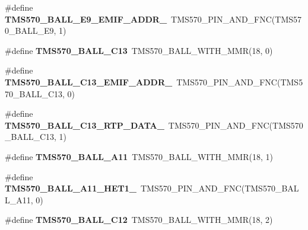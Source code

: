 \begin{DoxyCompactItemize}
\mbox{\label{tms570ls3137zwt-pins_8h_ada300d3784f0a8c7d62360eb2530f4e2}} 
\#define {\bfseries T\+M\+S570\+\_\+\+B\+A\+L\+L\+\_\+\+E9\+\_\+\+E\+M\+I\+F\+\_\+\+A\+D\+D\+R\+\_}~T\+M\+S570\+\_\+\+P\+I\+N\+\_\+\+A\+N\+D\+\_\+\+F\+NC(T\+M\+S570\+\_\+\+B\+A\+L\+L\+\_\+\+E9, 1)
\item 
\mbox{\label{tms570ls3137zwt-pins_8h_a3f60b3ca069714dc7c5f8578854b7519}} 
\#define {\bfseries T\+M\+S570\+\_\+\+B\+A\+L\+L\+\_\+\+C13}~T\+M\+S570\+\_\+\+B\+A\+L\+L\+\_\+\+W\+I\+T\+H\+\_\+\+M\+MR(18, 0)
\item 
\mbox{\label{tms570ls3137zwt-pins_8h_ad6ff7babd233f7440f5c92e0936c03ad}} 
\#define {\bfseries T\+M\+S570\+\_\+\+B\+A\+L\+L\+\_\+\+C13\+\_\+\+E\+M\+I\+F\+\_\+\+A\+D\+D\+R\+\_}~T\+M\+S570\+\_\+\+P\+I\+N\+\_\+\+A\+N\+D\+\_\+\+F\+NC(T\+M\+S570\+\_\+\+B\+A\+L\+L\+\_\+\+C13, 0)
\item 
\mbox{\label{tms570ls3137zwt-pins_8h_a67861843cebc379d3e9bfcf88ddfd8d8}} 
\#define {\bfseries T\+M\+S570\+\_\+\+B\+A\+L\+L\+\_\+\+C13\+\_\+\+R\+T\+P\+\_\+\+D\+A\+T\+A\+\_}~T\+M\+S570\+\_\+\+P\+I\+N\+\_\+\+A\+N\+D\+\_\+\+F\+NC(T\+M\+S570\+\_\+\+B\+A\+L\+L\+\_\+\+C13, 1)
\item 
\mbox{\label{tms570ls3137zwt-pins_8h_a5327195f04ec3f99effadef3c257c1c8}} 
\#define {\bfseries T\+M\+S570\+\_\+\+B\+A\+L\+L\+\_\+\+A11}~T\+M\+S570\+\_\+\+B\+A\+L\+L\+\_\+\+W\+I\+T\+H\+\_\+\+M\+MR(18, 1)
\item 
\mbox{\label{tms570ls3137zwt-pins_8h_a261f50653c020fe71d3e217423aca396}} 
\#define {\bfseries T\+M\+S570\+\_\+\+B\+A\+L\+L\+\_\+\+A11\+\_\+\+H\+E\+T1\+\_}~T\+M\+S570\+\_\+\+P\+I\+N\+\_\+\+A\+N\+D\+\_\+\+F\+NC(T\+M\+S570\+\_\+\+B\+A\+L\+L\+\_\+\+A11, 0)
\item 
\mbox{\label{tms570ls3137zwt-pins_8h_a02aa4b1103f1f9c11864a2f36c1680f4}} 
\#define {\bfseries T\+M\+S570\+\_\+\+B\+A\+L\+L\+\_\+\+C12}~T\+M\+S570\+\_\+\+B\+A\+L\+L\+\_\+\+W\+I\+T\+H\+\_\+\+M\+MR(18, 2)
\item 
\mbox{\label{tms570ls3137zwt-pins_8h_ac609a560d6631c51b475c1b07c897c97}} 

\end{DoxyCompactItemize}
